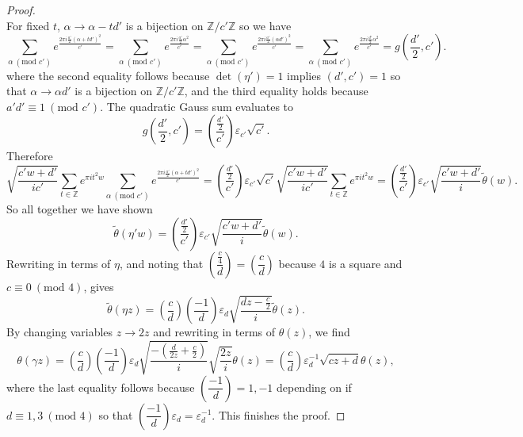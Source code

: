 \documentclass[12pt]{book}
\theoremstyle{definition}\newframedtheorem{method}{Method}
\newcommand{\legendre}[2]{\genfrac{(}{)}{0.5pt}{0}{#1}{#2}}
\newcommand{\tmod}[1]{\ \left(\text{mod }#1\right)}
\newcommand{\Z}{\mathbb{Z}}
\renewcommand{\a}{\alpha}
\newcommand{\g}{\gamma}
\renewcommand{\t}{\theta}
\newcommand{\e}{\varepsilon}
\newcommand{\<}{\langle}
\renewcommand{\>}{\rangle}
\newcommand{\wtilde}{\widetilde}
\begin{document}
\begin{proof}
\[      \]
      For fixed $t$, $\a \to \a-td'$ is a bijection on $\Z/c'\Z$ so we have
      \[
        \sum_{\a \tmod{c'}}e^{\frac{2\pi i\frac{a'}{2}(\a+td')^{2}}{c'}} = \sum_{\a \tmod{c'}}e^{\frac{2\pi i\frac{a'}{2}\a^{2}}{c'}} = \sum_{\a \tmod{c'}}e^{\frac{2\pi i\frac{a'}{2}(\a d')^{2}}{c'}} = \sum_{\a \tmod{c'}}e^{\frac{2\pi i\frac{d'}{2}\a^{2}}{c'}} = g\left(\frac{d'}{2},c'\right).
      \]
      where the second equality follows because $\det(\eta') = 1$ implies $(d',c') = 1$ so that $\a \to \a d'$ is a bijection on $\Z/c'\Z$, and the third equality holds because $a'd' \equiv 1 \tmod{c'}$. The quadratic Gauss sum evaluates to
      \[
        g\left(\frac{d'}{2},c'\right) = \legendre{\frac{d'}{2}}{c'}\e_{c'}\sqrt{c'}.
      \]
      Therefore
      \[
        \sqrt{\frac{c'w+d'}{ic'}}\sum_{t \in \Z}e^{\pi it^{2}w}\sum_{\a \tmod{c'}}e^{\frac{2\pi i\frac{a'}{2}(\a+td')^{2}}{c'}} = \legendre{\frac{d'}{2}}{c'}\e_{c'}\sqrt{c'}\sqrt{\frac{c'w+d'}{ic'}}\sum_{t \in \Z}e^{\pi it^{2}w} = \legendre{\frac{d'}{2}}{c'}\e_{c'}\sqrt{\frac{c'w+d'}{i}}\wtilde{\t}(w).
      \]
      So all together we have shown
      \[
        \wtilde{\t}(\eta' w) = \legendre{\frac{d'}{2}}{c'}\e_{c'}\sqrt{\frac{c'w+d'}{i}}\wtilde{\t}(w).
      \]
      Rewriting in terms of $\eta$, and noting that $\legendre{\frac{c}{4}}{d} = \legendre{c}{d}$ because $4$ is a square and $c \equiv 0 \tmod{4}$, gives
      \[
        \wtilde{\t}(\eta z) = \legendre{c}{d}\legendre{-1}{d}\e_{d}\sqrt{\frac{dz-\frac{c}{2}}{i}}\wtilde{\t}(z).
      \]
      By changing variables $z \to 2z$ and rewriting in terms of $\t(z)$, we find
      \[
        \t(\g z) = \legendre{c}{d}\legendre{-1}{d}\e_{d}\sqrt{\frac{-\left(\frac{d}{2z}+\frac{c}{2}\right)}{i}}\sqrt{\frac{2z}{i}}\t(z) = \legendre{c}{d}\e_{d}^{-1}\sqrt{cz+d}\t(z),
      \]
      where the last equality follows because $\legendre{-1}{d} = 1,-1$ depending on if $d \equiv 1,3 \tmod{4}$ so that $\legendre{-1}{d}\e_{d} = \e_{d}^{-1}$. This finishes the proof.
    \end{proof}
\end{document}
